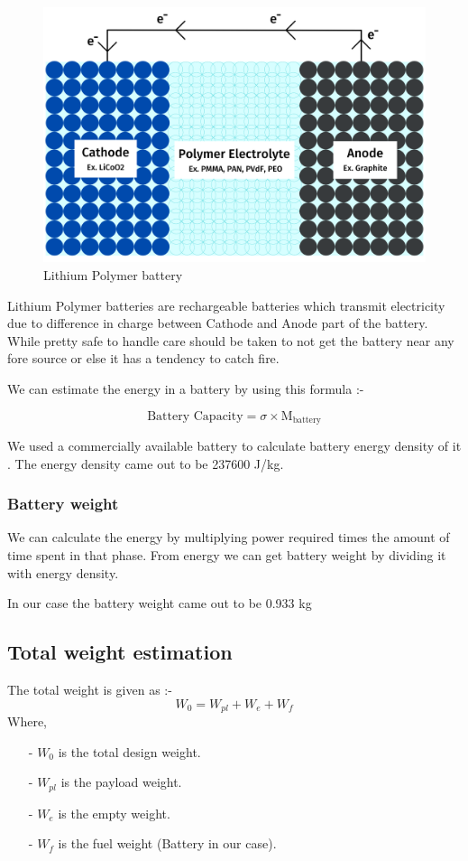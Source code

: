\documentclass[12 pt]{article}
\begin{document}
\begin{figure}[h]
    \centering
    \includegraphics[width=0.5\linewidth]{Extra pics/LiPo_battery_diagram.png}
    \caption{Lithium Polymer battery}
    \label{Lithium Polymer battery}
\end{figure}

Lithium Polymer batteries are rechargeable  batteries which transmit electricity due to difference in charge between Cathode and Anode part of the battery. While pretty safe to handle care should be taken to not get the battery near any fore source or else it has a tendency to catch fire.

We can estimate the energy in a battery by using this formula \cite{Lipobattery} :-

$$ \text{Battery Capacity} = \sigma \times \text{M}_\text{battery} $$

We used a commercially available battery to calculate battery energy density of it \cite{Batteryref}. The energy density came out to be 237600 J/kg.

\subsubsection{Battery weight}

We can calculate the energy by multiplying power required times the amount of time spent in that phase. From energy we can get battery weight by dividing it with energy density. 

In our case the battery weight came out to be 0.933 kg


\subsection{Total weight estimation}

The total weight is given as :- 
$$ W_0 = W_{pl} + W_{e} + W_{f} $$
Where,
\begin{itemize}
    \item[-] $W_0$ is the total design weight.
    \item [-] $W_{pl}$ is the payload weight.
    \item [-] $W_{e}$ is the empty weight.
    \item [-] $W_{f}$ is the fuel weight (Battery in our case).
\end{itemize}
\end{document}
